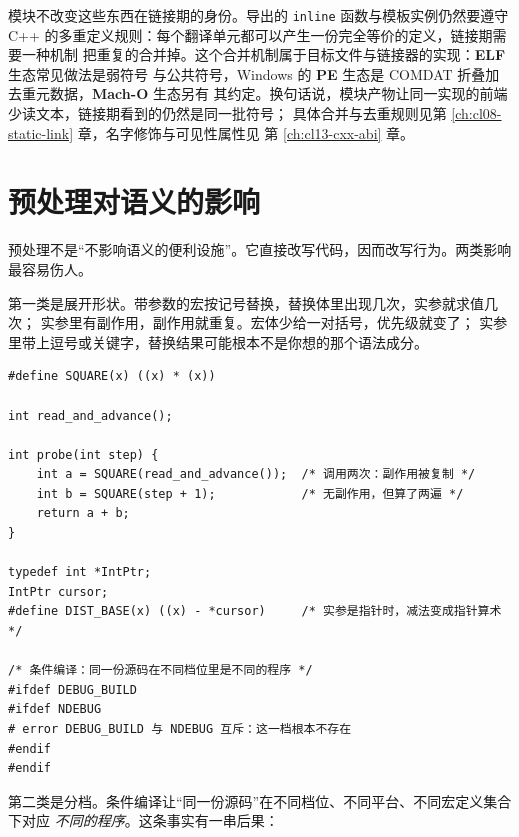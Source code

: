 \documentclass[12pt,a4paper,fontset=fandol]{ctexbook}
\newcommand{\Tp}[1]{\texttt{#1}}
\newcommand{\Lang}[1]{\textsf{#1}}
\newcommand{\CPP}{\Lang{C++}}
\newcommand{\Mx}[1]{\textsf{#1}}
\newcommand{\Elf}{\textbf{\textsf{ELF}}}
\newcommand{\PeFmt}{\textbf{\textsf{PE}}}
\newcommand{\Macho}{\textbf{\textsf{Mach-O}}}
\newcommand{\Win}{\textsf{Windows}}
\begin{document}
\begin{abibox}[title={模块接口里的模板与 inline 函数，链接期以什么身份存在}]
模块不改变这些东西在链接期的身份。导出的 \Tp{inline} 函数与模板实例仍然要遵守
\CPP{} 的多重定义规则：每个翻译单元都可以产生一份完全等价的定义，链接期需要一种机制
把重复的合并掉。这个合并机制属于目标文件与链接器的实现：\Elf{} 生态常见做法是弱符号
与公共符号，\Win{} 的 \PeFmt{} 生态是 \Mx{COMDAT} 折叠加去重元数据，\Macho{} 生态另有
其约定。换句话说，模块产物让同一实现的前端少读文本，链接期看到的仍然是同一批符号；
具体合并与去重规则见第 \ref{ch:cl08-static-link} 章，名字修饰与可见性属性见
第 \ref{ch:cl13-cxx-abi} 章。
\end{abibox}

\section{预处理对语义的影响}\label{sec:cl02-semantics}

预处理不是“不影响语义的便利设施”。它直接改写代码，因而改写行为。两类影响最容易伤人。

第一类是展开形状。带参数的宏按记号替换，替换体里出现几次，实参就求值几次；
实参里有副作用，副作用就重复。宏体少给一对括号，优先级就变了；
实参里带上逗号或关键字，替换结果可能根本不是你想的那个语法成分。

\begin{lstlisting}[style=cstyle,caption={宏把“一次求值”变成“多次求值”，把类型名当成变量名}]
#define SQUARE(x) ((x) * (x))

int read_and_advance();

int probe(int step) {
    int a = SQUARE(read_and_advance());  /* 调用两次：副作用被复制 */
    int b = SQUARE(step + 1);            /* 无副作用，但算了两遍 */
    return a + b;
}

typedef int *IntPtr;
IntPtr cursor;
#define DIST_BASE(x) ((x) - *cursor)     /* 实参是指针时，减法变成指针算术 */

/* 条件编译：同一份源码在不同档位里是不同的程序 */
#ifdef DEBUG_BUILD
#ifdef NDEBUG
# error DEBUG_BUILD 与 NDEBUG 互斥：这一档根本不存在
#endif
#endif
\end{lstlisting}

第二类是分档。条件编译让“同一份源码”在不同档位、不同平台、不同宏定义集合下对应
\emph{不同的程序}。这条事实有一串后果：
\end{document}
